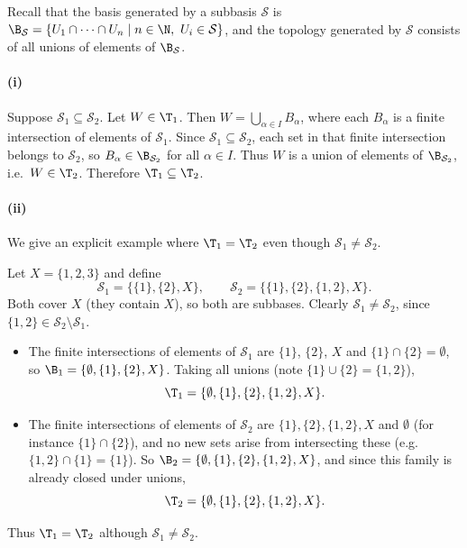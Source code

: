 
Recall that the basis generated by a subbasis $\mathcal{S}$ is
$\B_{\mathcal{S}}=\{U_1\cap\dots\cap U_n\mid n\in\N,\ U_i\in\mathcal{S}\}$, and the topology
generated by $\mathcal{S}$ consists of all unions of elements of $\B_{\mathcal{S}}$.

\paragraph{(i)} Suppose $\mathcal{S}_1\subseteq\mathcal{S}_2$. Let $W\in\T_1$. Then
$W=\bigcup_{\alpha\in I}B_\alpha$, where each $B_\alpha$ is a finite intersection of elements of
$\mathcal{S}_1$. Since $\mathcal{S}_1\subseteq\mathcal{S}_2$, each set in that finite
intersection belongs to $\mathcal{S}_2$, so $B_\alpha\in\B_{\mathcal{S}_2}$ for all
$\alpha\in I$. Thus $W$ is a union of elements of $\B_{\mathcal{S}_2}$, i.e.\ $W\in\T_2$.
Therefore $\T_1\subseteq\T_2$.

\paragraph{(ii)} We give an explicit example where $\T_1=\T_2$ even though
$\mathcal{S}_1\neq\mathcal{S}_2$.

Let $X=\{1,2,3\}$ and define
\[ \mathcal{S}_1=\bigl\{\{1\},\{2\},X\bigr\},\qquad
   \mathcal{S}_2=\bigl\{\{1\},\{2\},\{1,2\},X\bigr\}. \]
Both cover $X$ (they contain $X$), so both are subbases. Clearly
$\mathcal{S}_1\neq\mathcal{S}_2$, since $\{1,2\}\in\mathcal{S}_2\setminus\mathcal{S}_1$.
\begin{itemize}
  \item The finite intersections of elements of $\mathcal{S}_1$ are $\{1\}$, $\{2\}$, $X$ and
  $\{1\}\cap\{2\}=\emptyset$, so $\B_1=\{\emptyset,\{1\},\{2\},X\}$. Taking all unions (note
  $\{1\}\cup\{2\}=\{1,2\}$),
  \[ \T_1=\{\emptyset,\{1\},\{2\},\{1,2\},X\}. \]
  \item The finite intersections of elements of $\mathcal{S}_2$ are $\{1\},\{2\},\{1,2\},X$ and
  $\emptyset$ (for instance $\{1\}\cap\{2\}$), and no new sets arise from intersecting these
  (e.g.\ $\{1,2\}\cap\{1\}=\{1\}$). So $\B_2=\{\emptyset,\{1\},\{2\},\{1,2\},X\}$, and since this
  family is already closed under unions,
  \[ \T_2=\{\emptyset,\{1\},\{2\},\{1,2\},X\}. \]
\end{itemize}
Thus $\T_1=\T_2$ although $\mathcal{S}_1\neq\mathcal{S}_2$.


